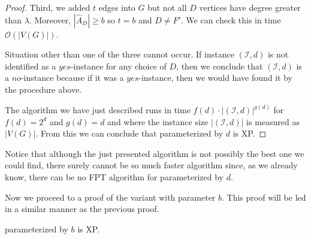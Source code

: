 \begin{proof}
    Third, we added $t$ edges into $G$ but not all $D$ vertices have degree greater than $\lambda$.
    Moreover, $|\hat{A}_D| \geq b$ so $t = b$ and $D \neq F'$.
    We can check this in time $\mathcal{O}(|V(G)|)$.

    Situation other than one of the three cannot occur.
    If instance $(\mathcal{I}, d)$ is not identified as a $yes$-instance for any choice of $D$,
    then we conclude that $(\mathcal{I}, d)$ is a $no$-instance because if it was a $yes$-instance,
    then we would have found it by the procedure above.
    
    The algorithm we have just described runs in time $f(d) \cdot |(\mathcal{I}, d)|^{g(d)}$ for $f(d) = 2^d$ and $g(d) = d$
    and where the instance size $|(\mathcal{I}, d)|$ is measured as $|V(G)|$.
    From this we can conclude that \HL parameterized by $d$ is XP.
\end{proof}

Notice that although the just presented algorithm is not possibly the best one we could find,
there surely cannot be so much faster algorithm since, as we already know,
there can be no FPT algorithm for \HL parameterized by $d$.


Now we proceed to a proof of the variant with parameter $b$.
This proof will be led in a similar manner as the previous proof.

\begin{theorem}\label{theorem:B:XP}
    \HL parameterized by $b$ is XP.
\end{theorem}

